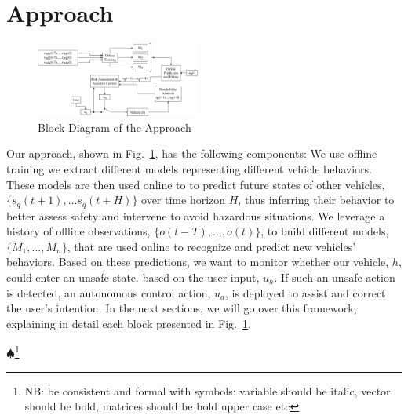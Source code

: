 \documentclass[letterpaper, 10 pt, conference]{ieeeconf}  %
\newcommand\NB[1]{$\spadesuit$\footnote{NB: #1}}
\begin{document}
\section{Approach} \label{sec:approach}%
\begin{figure}[ht]
    \includegraphics[width=0.48\textwidth]{fig/approach2.png}
    \caption{Block Diagram of the Approach}
    \label{fig:app}
\end{figure}
Our approach, shown in Fig.~\ref{fig:app}, has the following components: We use offline training we extract different models representing different vehicle behaviors. These models are then used online to to predict future states of other vehicles, $\{s_q(t+1),\ldots s_q(t+H)\}$ over time horizon $H$, thus inferring their behavior to better assess safety and intervene to avoid hazardous situations. We leverage a history of offline observations, $\{o(t-T),\ldots,o(t)\}$, to build different models, $\{M_1,\ldots,M_n\}$, that are used online to recognize and predict new vehicles' behaviors. Based on these predictions, we want to monitor whether our vehicle, $h$, could enter an unsafe state.
 based on the user input, $u_h$. 
 If such an unsafe action is detected, an autonomous control action, $u_a$, is deployed to assist and correct the user's intention. In the next sections, we will go over this framework, explaining in detail each block presented in Fig.~\ref{fig:app}.
 
\NB{be consistent and formal with symbols: variable should be italic, vector should be bold, matrices should be bold upper case etc }
\end{document}

